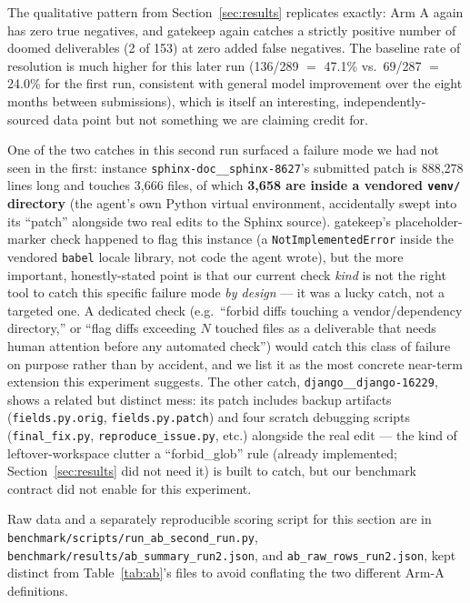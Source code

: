 \documentclass{article}
\begin{document}
The qualitative pattern from Section~\ref{sec:results} replicates exactly:
Arm A again has zero true negatives, and gatekeep again catches a strictly
positive number of doomed deliverables (2 of 153) at zero added false
negatives. The baseline rate of resolution is much higher for this later
run (136/289 $=$ 47.1\% vs.\ 69/287 $=$ 24.0\% for the first run, consistent
with general model improvement over the eight months between submissions),
which is itself an interesting, independently-sourced data point but not
something we are claiming credit for.

One of the two catches in this second run surfaced a failure mode we had
not seen in the first: instance \texttt{sphinx-doc\_\_sphinx-8627}'s
submitted patch is 888{,}278 lines long and touches 3{,}666 files, of which
\textbf{3{,}658 are inside a vendored \texttt{venv/} directory} (the
agent's own Python virtual environment, accidentally swept into its
``patch'' alongside two real edits to the Sphinx source). gatekeep's
placeholder-marker check happened to flag this instance (a
\texttt{NotImplementedError} inside the vendored \texttt{babel} locale
library, not code the agent wrote), but the more important, honestly-stated
point is that our current check \emph{kind} is not the right tool to catch
this specific failure mode \emph{by design} --- it was a lucky catch, not
a targeted one. A dedicated check (e.g.\ ``forbid diffs touching a
vendor/dependency directory,'' or ``flag diffs exceeding $N$ touched
files as a deliverable that needs human attention before any automated
check'') would catch this class of failure on purpose rather than by
accident, and we list it as the most concrete near-term extension this
experiment suggests. The other catch, \texttt{django\_\_django-16229},
shows a related but distinct mess: its patch includes backup artifacts
(\texttt{fields.py.orig}, \texttt{fields.py.patch}) and four scratch
debugging scripts (\texttt{final\_fix.py}, \texttt{reproduce\_issue.py},
etc.) alongside the real edit --- the kind of leftover-workspace clutter a
``forbid\_glob'' rule (already implemented; Section~\ref{sec:results} did
not need it) is built to catch, but our benchmark contract did not enable
for this experiment.

Raw data and a separately reproducible scoring script for this section are
in \texttt{benchmark/scripts/run\_ab\_second\_run.py},
\texttt{benchmark/results/ab\_summary\_run2.json}, and
\texttt{ab\_raw\_rows\_run2.json}, kept distinct from
Table~\ref{tab:ab}'s files to avoid conflating the two different Arm-A
definitions.
\end{document}
